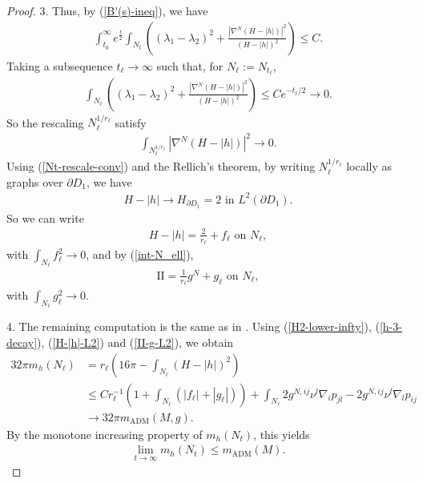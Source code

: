 \documentclass[11pt, letterpaper]{amsart}
\theoremstyle{definition}
\theoremstyle{remark}
\begin{document}
\begin{proof}
3.  Thus, by (\ref{B'(s)-ineq}), we have
\begin{align*}
	\int_{t_0} ^{\infty} e ^{\frac{t}{2}} \int_{N_t}\left(  (\lambda _1 - \lambda _2)^2 + \frac{|\nabla ^{N} (H-|h|)|^2}{(H-|h|)^2} \right) \leq C.
\end{align*} 
Taking a subsequence $t_{\ell} \to \infty$ such that, for $N_{\ell} := N_{t_\ell}$, 
\begin{align}\label{int-N_ell}
	\int_{N_\ell} \left(  (\lambda _1 - \lambda _2)^2 + \frac{|\nabla ^{N} (H-|h|)|^2}{(H-|h|)^2} \right) \leq C e ^{- t_\ell / 2} \to 0.
\end{align} 
So the rescaling $N_{\ell}^{1 / r_{\ell}}$ satisfy 
\begin{align*}
	\int_{N_{\ell}^{1 / r_{\ell}}} |\nabla ^{N} (H -|h|)|^2 \to 0.
\end{align*} 
Using (\ref{Nt-rescale-conv}) and the Rellich's theorem, by writing $N_{\ell} ^{1 / r_{\ell}}$ locally as graphs over $\partial D_1$, we have
\begin{align*}
	H - |h| \to H_{\partial D_1}= 2 \text{ in } L^2(\partial D_1).
\end{align*} 
So we can write
\begin{align}\label{H-|h|-L2}
	H - |h| = \frac{2}{r_{\ell}} + f_{\ell} \text{ on } N_{\ell},
\end{align} 
with $\int_{N_{\ell}} f_{\ell}^2 \to 0$, and by (\ref{int-N_ell}),
\begin{align}\label{II-g-L2}
	\mathrm{II} = \frac{1}{r_{\ell}} g ^{N} + g_{\ell} \text{ on } N_{\ell},
\end{align} 
with $\int_{N_{\ell}} g_{\ell}^2 \to 0$.

4. The remaining computation is the same as in \cite{HI01}. Using (\ref{H2-lower-infty}), (\ref{h-3-decay}), (\ref{H-|h|-L2}) and (\ref{II-g-L2}), we obtain
\begin{align*}
	32 \pi m_{h}(N_\ell) &= r_{\ell} \left( 16 \pi - \int_{N_{\ell}} (H-|h|)^2 \right) \\
			     &\leq C r_{\ell} ^{-1} \left( 1+ \int_{N_{\ell}} (|f_{\ell}| + |g_{\ell}|) \right) + \int_{N_{\ell}} 2 g ^{N, ij} \nu ^{l} \nabla _{i} p_{jl} - 2 g ^{N, ij} \nu ^{l} \nabla _{l} p_{ij}\\
			     &\to 32 \pi m_{\mathrm{ADM}}(M,g).
\end{align*} 
By the monotone increasing property of $m_{h}(N_t)$, this yields
\begin{align*}
	\lim_{t \to \infty} m_{h}(N_{t}) \leq m_{\mathrm{ADM}}(M).
\end{align*} 


\end{proof}
\end{document}
